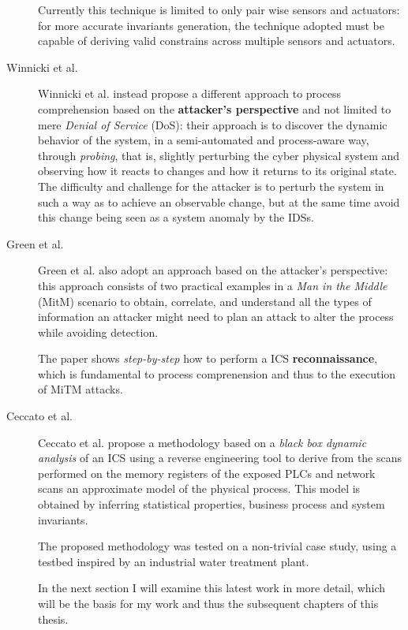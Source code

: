 \begin{description}
	Currently this technique is limited to only pair wise sensors and actuators: for more accurate invariants generation, the technique adopted must be capable of deriving valid constrains across multiple sensors and actuators.
	
	\item[Winnicki et al.] Winnicki et al. \cite{winnicki_et_al} instead propose a different approach to process comprehension based on the \textbf{attacker's perspective} and not limited to mere \textit{Denial of Service} (DoS): their approach is to discover the dynamic behavior of the system, in a semi-automated and process-aware way, through \textit{probing}, that is, slightly perturbing the cyber physical system and observing how it reacts to changes and how it returns to its original state. The difficulty and challenge for the attacker is to perturb the system in such a way as to achieve an observable change, but at the same time avoid this change being seen as a system anomaly by the IDSs.
	
	\item[Green et al.] Green et al. \cite{green_et_al} also adopt an approach based on the attacker's perspective: this approach consists of two practical examples in a \textit{Man in the Middle} (MitM) scenario to obtain, correlate, and understand all the types of information an attacker might need to plan an attack to alter the process while avoiding detection.
	
	The paper shows \textit{step-by-step} how to perform a ICS \textbf{reconnaissance}, which is fundamental to process comprenension and thus to the execution of MiTM attacks.
	
	\item[Ceccato et al.] Ceccato et al. \cite{ceccato} propose a methodology based on a \textit{black box dynamic analysis} of an ICS using a reverse engineering tool to derive from the scans performed on the memory registers of the exposed PLCs and network scans an approximate model of the physical process. This model is obtained by inferring statistical properties, business process and system invariants.
	
	The proposed methodology was tested on a non-trivial case study, using a testbed inspired by an industrial water treatment plant.
	
	In the next section I will examine this latest work in more detail, which will be the basis for my work and thus the subsequent chapters of this thesis.

\end{description}


